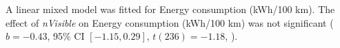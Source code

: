A linear mixed model was fitted for Energy consumption (kWh/100 km).
The effect of \textit{nVisible} on Energy consumption (kWh/100 km) was not significant ($b = -0.43$, 95\% CI $[-1.15, 0.29]$, $t(236) = -1.18$, ).
